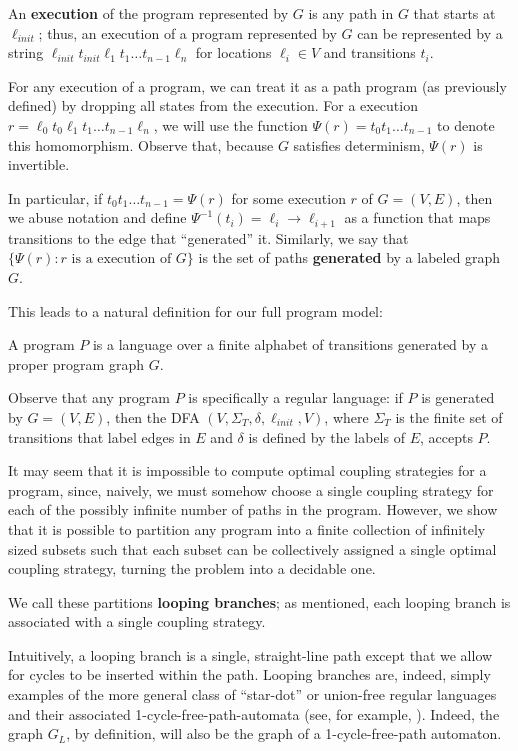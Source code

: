 An \textbf{execution} of the program represented by $G$ is any path in $G$ that starts at $\ell_{init}$; thus, an execution of a program represented by $G$ can be represented by a string $\ell_{init}t_{init}\ell_1t_1\ldots t_{n-1}\ell_n$ for locations $\ell_i\in V$ and transitions $t_i$.

For any execution of a program, we can treat it as a path program (as previously defined) by dropping all states from the execution. For a execution $r=\ell_0t_0\ell_1t_1\ldots t_{n-1}\ell_n$, we will use the function $\Psi(r) = t_0t_1\ldots t_{n-1}$ to denote this homomorphism. Observe that, because $G$ satisfies determinism, $\Psi(r)$ is invertible. 

In particular, if $t_0t_1\ldots t_{n-1} = \Psi(r)$ for some execution $r$ of $G = (V, E)$, then we abuse notation and define $\Psi^{-1}(t_i) = \ell_i\to\ell_{i+1}$ as a function that maps transitions to the edge that ``generated'' it. Similarly, we say that $\{\Psi(r): r\text{ is a execution of }G\}$ is the set of paths \textbf{generated} by a labeled graph $G$. 

This leads to a natural definition for our full program model: 
\begin{defn}[Programs]
    A program $P$ is a language over a finite alphabet of transitions generated by a proper program graph $G$.
\end{defn}

Observe that any program $P$ is specifically a regular language: if $P$ is generated by $G = (V, E)$, then the DFA $(V, \Sigma_T, \delta, \ell_{init}, V)$, where $\Sigma_T$ is the finite set of transitions that label edges in $E$ and $\delta$ is defined by the labels of $E$, accepts $P$. 

It may seem that it is impossible to compute optimal coupling strategies for a program, since, naively, we must somehow choose a single coupling strategy for each of the possibly infinite number of paths in the program. However, we show that it is possible to partition any program into a finite collection of infinitely sized subsets such that each subset can be collectively assigned a single optimal coupling strategy, turning the problem into a decidable one.

We call these partitions \textbf{looping branches}; as mentioned, each looping branch is associated with a single coupling strategy. 

Intuitively, a looping branch is a single, straight-line path except that we allow for cycles to be inserted within the path. Looping branches are, indeed, simply examples of the more general class of ``star-dot'' or union-free regular languages and their associated 1-cycle-free-path-automata (see, for example, \cite{nagy2006union}). Indeed, the graph $G_L$, by definition, will also be the graph of a 1-cycle-free-path automaton. 

